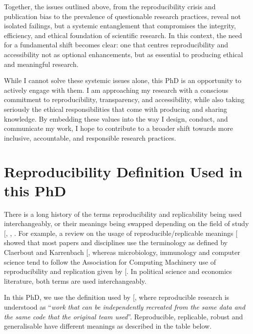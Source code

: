 \documentclass[
  11pt,
  letterpaper,
]{scrreprt}
\begin{document}
Together, the issues outlined above, from the reproducibility crisis and
publication bias to the prevalence of questionable research practices,
reveal not isolated failings, but a systemic entanglement that
compromises the integrity, efficiency, and ethical foundation of
scientific research. In this context, the need for a fundamental shift
becomes clear: one that centres reproducibility and accessibility not as
optional enhancements, but as essential to producing ethical and
meaningful research.

While I cannot solve these systemic issues alone, this PhD is an
opportunity to actively engage with them. I am approaching my research
with a conscious commitment to reproducibility, transparency, and
accessibility, while also taking seriously the ethical responsibilities
that come with producing and sharing knowledge. By embedding these
values into the way I design, conduct, and communicate my work, I hope
to contribute to a broader shift towards more inclusive, accountable,
and responsible research practices.

\section{Reproducibility Definition Used in this
PhD}\label{reproducibility-definition-used-in-this-phd}

There is a long history of the terms reproducibility and replicability
being used interchangeably, or their meanings being swapped depending on
the field of study
{[},
,
\citeproc{ref-plesser2018ReproducibilityVsReplicability}{355}{]}. For
example, a review on the usage of reproducible/replicable meanings
{[}\citeproc{ref-barba2018TerminologiesReproducibleResearch}{356}{]}
showed that most papers and disciplines use the terminology as defined
by Claerbout and Karrenbach
{[}\citeproc{ref-claerbout1992ElectronicDocumentsGive}{354}{]}, whereas
microbiology, immunology and computer science tend to follow the
Association for Computing Machinery use of reproducibility and
replication given by
{[}\citeproc{ref-ivie2018ReproducibilityScientificComputing}{90}{]}. In
political science and economics literature, both terms are used
interchangeably.

In this PhD, we use the definition used by
{[}\citeproc{ref-turingwaycommunity2019TuringWayHandbook}{357}{]}, where
reproducible research is understood as ``\emph{work that can be
independently recreated from the same data and the same code that the
original team used}''. Reproducible, replicable, robust and
generalisable have different meanings as described in the table below.
\end{document}
